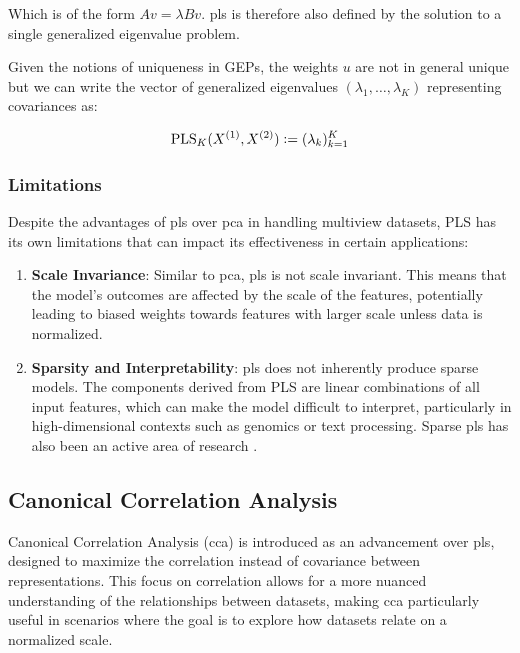 Which is of the form $A v = \lambda B v$. \acrshort{pls} is therefore also defined by the solution to a single generalized eigenvalue problem.

Given the notions of uniqueness in GEPs, the weights $u$ are not in general unique but we can write the vector of generalized eigenvalues $(\lambda_1, \dots, \lambda_K)$ representing covariances as:

\begin{align}
    \label{eq:pls-vector-of-correlations-def}
    \operatorname{PLS}_K(X^{(1)},X^{(2)}) \vcentcolon= (\lambda_k)_{k=1}^K
\end{align}

\subsubsection{Limitations} 

Despite the advantages of \acrshort{pls} over \acrshort{pca} in handling multiview datasets, PLS has its own limitations that can impact its effectiveness in certain applications:
\begin{enumerate}
    \item \textbf{Scale Invariance}: Similar to \acrshort{pca}, \acrshort{pls} is not scale invariant. This means that the model's outcomes are affected by the scale of the features, potentially leading to biased weights towards features with larger scale unless data is normalized.
    \item \textbf{Sparsity and Interpretability}: \acrshort{pls} does not inherently produce sparse models. The components derived from PLS are linear combinations of all input features, which can make the model difficult to interpret, particularly in high-dimensional contexts such as genomics or text processing. Sparse \acrshort{pls} has also been an active area of research \citep{chun2010sparse, witten2009penalized}.
\end{enumerate}

\subsection{Canonical Correlation Analysis}\label{sec:cca}

Canonical Correlation Analysis (\acrshort{cca}) is introduced as an advancement over \acrshort{pls}, designed to maximize the correlation instead of covariance between representations. This focus on correlation allows for a more nuanced understanding of the relationships between datasets, making \acrshort{cca} particularly useful in scenarios where the goal is to explore how datasets relate on a normalized scale.

